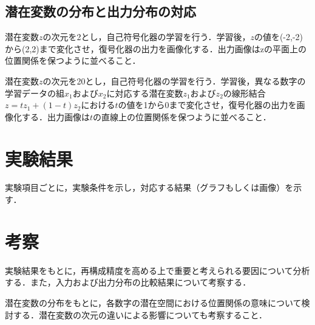 \documentclass[12pt]{jsarticle}
\begin{document}
\subsection{潜在変数の分布と出力分布の対応}

潜在変数$z$の次元を2とし，自己符号化器の学習を行う．学習後，$z$の値を(-2,-2)から(2,2)まで変化させ，復号化器の出力を画像化する．出力画像はzの平面上の位置関係を保つように並べること．

潜在変数$z$の次元を20とし，自己符号化器の学習を行う．学習後，異なる数字の学習データの組$x_1$および$x_2$に対応する潜在変数$z_1$および$z_2$の線形結合$z=t z_1+(1-t) z_2$における$t$の値を1から0まで変化させ，復号化器の出力を画像化する．出力画像は$t$の直線上の位置関係を保つように並べること．



\section{実験結果}

実験項目ごとに，実験条件を示し，対応する結果（グラフもしくは画像）を示す．

\section{考察}

実験結果をもとに，再構成精度を高める上で重要と考えられる要因について分析する．また，入力および出力分布の比較結果について考察する．

潜在変数の分布をもとに，各数字の潜在空間における位置関係の意味について検討する．潜在変数の次元の違いによる影響についても考察すること．
\end{document}
